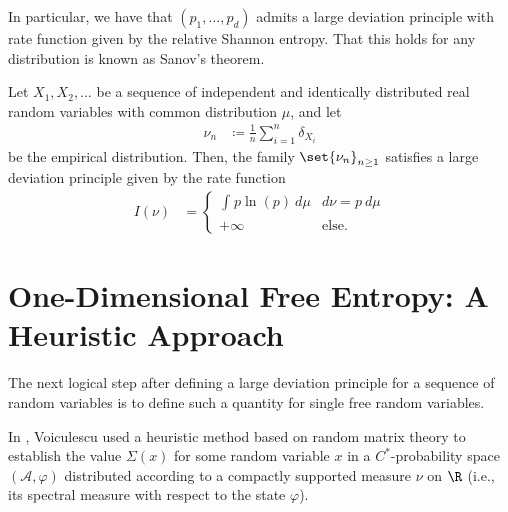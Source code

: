 \documentclass[10pt]{mypackage}
\renewcommand{\coloneq}{\coloneqq}
\begin{document}
In particular, we have that $\left( p_1,\dots,p_d \right)$ admits a large deviation principle with rate function given by the relative Shannon entropy. That this holds for any distribution is known as Sanov's theorem.
\begin{theorem}
  Let $X_1,X_2,\dots$ be a sequence of independent and identically distributed real random variables with common distribution $\mu$, and let
  \begin{align*}
    \nu_n &\coloneq \frac{1}{n}\sum_{i=1}^{n}\delta_{X_i}
  \end{align*}
  be the empirical distribution. Then, the family $\set{\nu_n}_{n\geq 1}$ satisfies a large deviation principle given by the rate function
  \begin{align*}
    I\left( \nu \right) &= \begin{cases}
      \int_{}^{} p\ln(p)\:d\mu & d\nu = p\:d\mu\\
      +\infty & \text{else}.
    \end{cases}
  \end{align*}
\end{theorem}
\section{One-Dimensional Free Entropy: A Heuristic Approach}%
The next logical step after defining a large deviation principle for a sequence of random variables is to define such a quantity for single free random variables.

In \cite{voiculescu_analogues_1}, Voiculescu used a heuristic method based on random matrix theory to establish the value $\Sigma(x)$ for some random variable $x$ in a $C^{\ast}$-probability space $\left( \mathcal{A},\varphi \right)$ distributed according to a compactly supported measure $\nu$ on $\R$ (i.e., its spectral measure with respect to the state $\varphi$).
\end{document}
